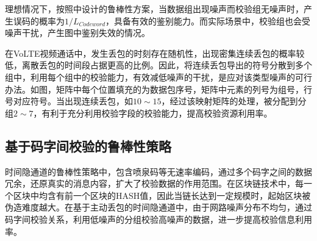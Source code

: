 理想情况下，按照中设计的鲁棒性方案，当数据组出现噪声而校验组无噪声时，产生误码的概率为$1/L_{Codeword}$，具备有效的鉴别能力。而实际场景中，校验组也会受噪声干扰，产生图中鉴别失效的情况。


在VoLTE视频通话中，发生丢包的时刻存在随机性，出现密集连续丢包的概率较低，离散丢包的时间段占据更高的比例。因此，将连续丢包导出的符号分散到多个组中，利用每个组中的校验能力，有效减低噪声的干扰，是应对该类型噪声的可行办法。如图，矩阵中每个位置填充的为数据包序号，矩阵中元素的列号为组号，行号对应符号。当出现连续丢包，如$10\sim 15$，经过该映射矩阵的处理，被分配到分组$2\sim 7$，有利于充分利用校验字段的校验能力，提高校验资源利用率。

\subsection{基于码字间校验的鲁棒性策略}
\label{chap:hash:motivation:robustness}

时间隐通道的鲁棒性策略中，包含喷泉码等无速率编码，通过多个码字之间的数据冗余，还原真实的消息内容，扩大了校验数据的作用范围。在区块链技术中，每一个区块中均含有前一个区块的HASH值，因此当链长达到一定规模时，起始区块被伪造难度越大。在基于主动丢包的时间隐通道中，由于网路噪声分布不均匀，通过码字间校验关系，利用低噪声的分组校验高噪声的数据，进一步提高校验信息利用率。


